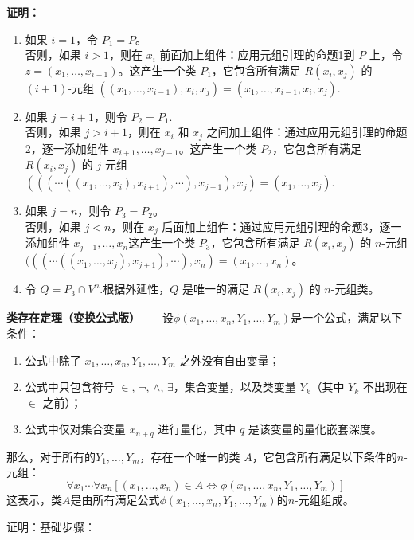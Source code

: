 \textbf{证明：}
\begin{enumerate}
\item 如果 \( i = 1 \)，令 \( P_1 = P \)。\\
否则，如果 \( i > 1 \)，则在 \( x_i \) 前面加上组件：应用元组引理的命题1到 \( P \) 上，令 \( z = (x_1, \dots, x_{i-1}) \)。这产生一个类 \( P_1 \)，它包含所有满足 \( R(x_i, x_j) \) 的 \( (i+1) \)-元组 \( ((x_1, \dots, x_{i-1}), x_i, x_j) = (x_1, \dots, x_{i-1}, x_i, x_j) \).\\
\item 如果 \( j = i + 1 \)，则令 \( P_2 = P_1 \).\\
否则，如果 \( j > i + 1 \)，则在 \( x_i \) 和 \( x_j \) 之间加上组件：通过应用元组引理的命题2，逐一添加组件 \( x_{i+1}, \dots, x_{j-1} \)。这产生一个类 \( P_2 \)，它包含所有满足 \( R(x_i, x_j) \) 的 \( j \)-元组 \( (((\cdots ((x_1, \dots, x_i), x_{i+1}), \cdots ), x_{j-1}), x_j) = (x_1, \dots, x_j) \).\\
\item 如果 \( j = n \)，则令 \( P_3 = P_2 \)。\\
否则，如果 \( j < n \)，则在 \( x_j \) 后面加上组件：通过应用元组引理的命题3，逐一添加组件 \( x_{j+1}, \dots, x_n \)这产生一个类 \( P_3 \)，它包含所有满足 \( R(x_i, x_j) \) 的 \( n \)-元组 \( (((\cdots ((x_1, \dots, x_j), x_{j+1}), \cdots ), x_n) = (x_1, \dots, x_n) \)。
\item 令 \( Q = P_3 \cap V^n \).根据外延性，\( Q \) 是唯一的满足 \( R(x_i, x_j) \) 的 \( n \)-元组类。
\end{enumerate}
\textbf{类存在定理（变换公式版）}——设\(\phi(x_1, \dots, x_n, Y_1, \dots, Y_m)\)是一个公式，满足以下条件：
\begin{enumerate}
\item 公式中除了 \(x_1, \dots, x_n, Y_1, \dots, Y_m\) 之外没有自由变量；
\item 公式中只包含符号 \(\in\), \(\neg\), \(\land\), \(\exists\)，集合变量，以及类变量 \(Y_k\)（其中 \(Y_k\) 不出现在 \(\in\) 之前）；
\item 公式中仅对集合变量 \(x_{n+q}\) 进行量化，其中 \(q\) 是该变量的量化嵌套深度。
\end{enumerate}
那么，对于所有的\(Y_1, \dots, Y_m\)，存在一个唯一的类 \(A\)，它包含所有满足以下条件的\(n\)-元组：
\[
\forall x_1 \cdots \forall x_n [(x_1, \dots, x_n) \in A \iff \phi(x_1, \dots, x_n, Y_1, \dots, Y_m)]~
\]
这表示，类\(A\)是由所有满足公式\(\phi(x_1, \dots, x_n, Y_1, \dots, Y_m)\)的\(n\)-元组组成。

证明：基础步骤：

